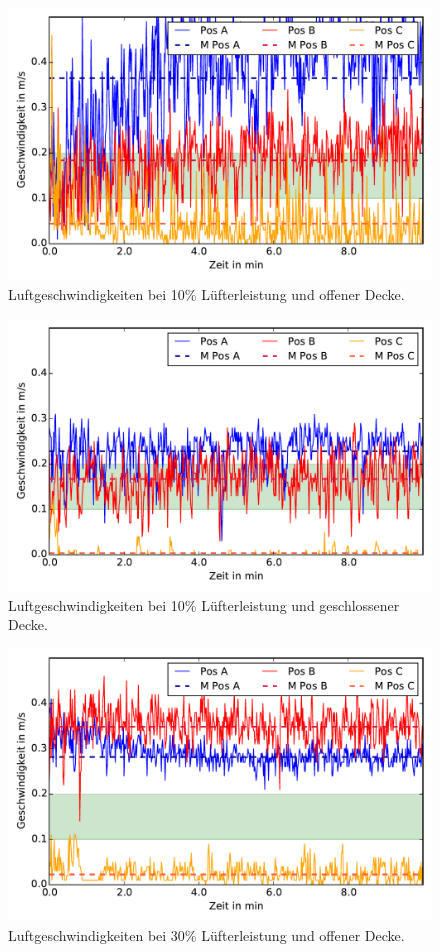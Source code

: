 \begin{figure}[h!tb]
\centering
\includegraphics[scale=.8]{Pictures/AV10pctOC.pdf}
\caption{Luftgeschwindigkeiten bei 10\% Lüfterleistung und offener Decke.}
\label{fig:10pctOC}
\end{figure}


\begin{figure}[h!tb]
\centering
\includegraphics[scale=.8]{Pictures/AV10pctCC.pdf}
\caption{Luftgeschwindigkeiten bei 10\% Lüfterleistung und geschlossener Decke.}
\label{fig:10pctCC}
\end{figure}


\begin{figure}[h!tb]
\centering
\includegraphics[scale=.8]{Pictures/AV30pctOC.pdf}
\caption{Luftgeschwindigkeiten bei 30\% Lüfterleistung und offener Decke.}
\label{fig:30pctOC}
\end{figure}


